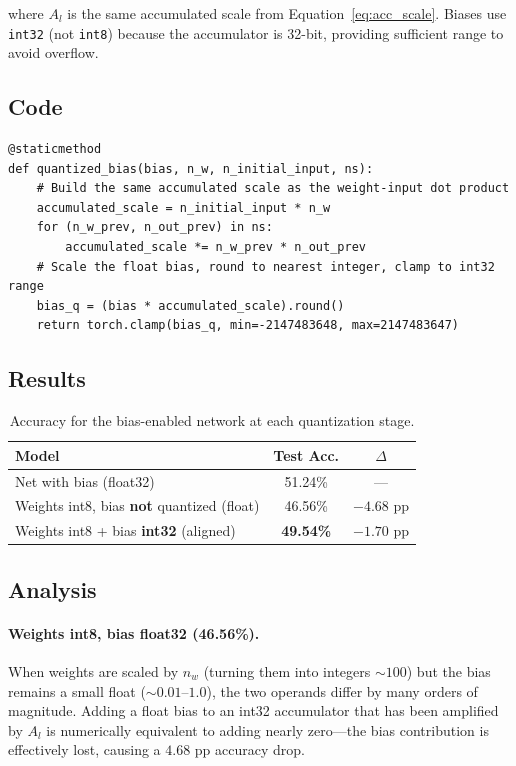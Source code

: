 \documentclass[11pt, letterpaper]{article}
\begin{document}
where $A_l$ is the same accumulated scale from Equation~\eqref{eq:acc_scale}.
Biases use \texttt{int32} (not \texttt{int8}) because the accumulator is 32-bit,
providing sufficient range to avoid overflow.

\subsection{Code}

\begin{lstlisting}[caption={Bias quantization to int32 --- \texttt{quantized\_bias}.}]
@staticmethod
def quantized_bias(bias, n_w, n_initial_input, ns):
    # Build the same accumulated scale as the weight-input dot product
    accumulated_scale = n_initial_input * n_w
    for (n_w_prev, n_out_prev) in ns:
        accumulated_scale *= n_w_prev * n_out_prev
    # Scale the float bias, round to nearest integer, clamp to int32 range
    bias_q = (bias * accumulated_scale).round()
    return torch.clamp(bias_q, min=-2147483648, max=2147483647)
\end{lstlisting}

\subsection{Results}

\begin{table}[H]
  \centering
  \caption{Accuracy for the bias-enabled network at each quantization stage.}
  \label{tab:bias}
  \begin{tabular}{lcc}
    \toprule
    \textbf{Model}                                       & \textbf{Test Acc.} & \textbf{$\Delta$} \\
    \midrule
    Net with bias (float32)                              & 51.24\%   & ---         \\
    Weights int8, bias \textbf{not} quantized (float)   & 46.56\%   & $-4.68$ pp  \\
    Weights int8 + bias \textbf{int32} (aligned)        & \textbf{49.54\%}  & $-1.70$ pp  \\
    \bottomrule
  \end{tabular}
\end{table}

\subsection{Analysis}

\paragraph{Weights int8, bias float32 (46.56\%).}
When weights are scaled by $n_w$ (turning them into integers $\sim100$) but the
bias remains a small float ($\sim0.01$--$1.0$), the two operands differ by many
orders of magnitude. Adding a float bias to an int32 accumulator that has been
amplified by $A_l$ is numerically equivalent to adding nearly zero---the bias
contribution is effectively lost, causing a $4.68$ pp accuracy drop.
\end{document}

